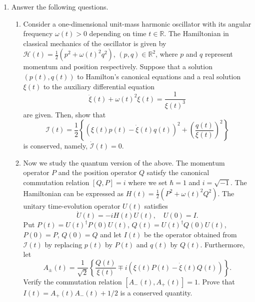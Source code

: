 \documentclass{article}
\begin{document}
\begin{enumerate}[label=\fbox{\arabic*}]
  \item %
        Answer the following questions.
        \begin{enumerate}[label=(\roman*)]
          \item Consider a one-dimensional unit-mass harmonic oscillator with its angular frequency $\omega(t) > 0$ depending on time $t \in \mathbb{R}$. The Hamiltonian in classical mechanics of the oscillator is given by $\mathcal{H}(t) = \frac{1}{2} (p^2 + \omega(t)^2 q^2)$, $(p, q) \in \mathbb{R}^2$, where $p$ and $q$ represent momentum and position respectively. Suppose that a solution $(p(t), q(t))$ to Hamilton's canonical equations and a real solution $\xi(t)$ to the auxiliary differential equation
          \[
            \ddot{\xi}(t) + \omega(t)^2 \xi(t) = \frac{1}{\xi(t)^3}
          \]
          are given. Then, show that
          \[
            \mathcal{I}(t) = \frac{1}{2} \left\{ \left( \xi(t) p(t) - \dot{\xi}(t) q(t) \right)^2 + \left( \frac{q(t)}{\xi(t)} \right)^2 \right\}
          \]
          is conserved, namely, $\dot{\mathcal{I}}(t) = 0$.
          \item Now we study the quantum version of the above. The momentum operator $P$ and the position operator $Q$ satisfy the canonical commutation relation $[Q, P] = i$ where we set $\hbar = 1$ and $i = \sqrt{-1}$. The Hamiltonian can be expressed as $H(t) = \frac{1}{2} (P^2 + \omega(t)^2 Q^2)$. The unitary time-evolution operator $U(t)$ satisfies
          \[
            \dot{U}(t) = -i H(t) U(t), \quad U(0) = I.
          \]
          Put $P(t) = U(t)^\dagger P(0) U(t)$, $Q(t) = U(t)^\dagger Q(0) U(t)$, $P(0) = P$, $Q(0) = Q$ and let $I(t)$ be the operator obtained from $\mathcal{I}(t)$ by replacing $p(t)$ by $P(t)$ and $q(t)$ by $Q(t)$. Furthermore, let
          \[
            A_\pm(t) = \frac{1}{\sqrt{2}} \left\{ \frac{Q(t)}{\xi(t)} \mp i \left( \xi(t) P(t) - \dot{\xi}(t) Q(t) \right) \right\}.
          \]
          Verify the commutation relation $[A_-(t), A_+(t)] = 1$. Prove that $I(t) = A_+(t)A_-(t) + 1/2$ is a conserved quantity.
        \end{enumerate}
\end{enumerate}

\newpage
\end{document}
